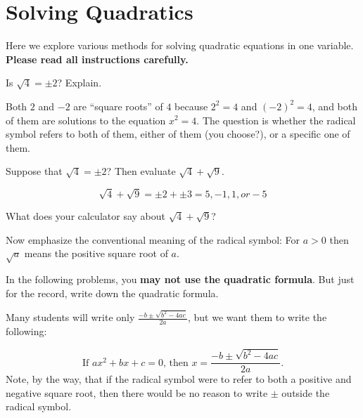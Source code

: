 \newpage
\section{Solving Quadratics}\label{A:solvingQuadratics}
Here we explore various methods for solving quadratic equations in one variable.  \textbf{Please read all instructions carefully.}

\begin{prob}
Is $\sqrt{4}=\pm 2$?  Explain. 
\end{prob}

\vfill

\begin{teachingnote}
Both $2$ and $-2$ are ``square roots'' of $4$ because $2^2=4$ and $(-2)^2=4$, and both of them are solutions to the equation $x^2=4$.  The question is whether the radical symbol refers to both of them, either of them (you choose?), or a specific one of them.  
\end{teachingnote}

\begin{prob}
Suppose that $\sqrt{4}=\pm 2$?  Then evaluate $\sqrt{4}+\sqrt{9}$.  
\end{prob}

\begin{teachingnote}
$$\sqrt{4}+\sqrt{9}=\pm2+\pm3=5, -1, 1, or -5$$
\end{teachingnote}

\vfill

\begin{prob}
What does your calculator say about $\sqrt{4}+\sqrt{9}$?  
\end{prob}

\vfill 

\begin{teachingnote}
Now emphasize the conventional meaning of the radical symbol:  For $a>0$ then $\sqrt{a}$ means the positive square root of $a$.  
\end{teachingnote}



\begin{prob}
In the following problems, you \textbf{may not use the quadratic formula}.  But just for the record, write down the quadratic formula.  
\end{prob}
\begin{teachingnote}
Many students will write only $\frac{-b\pm\sqrt{b^2-4ac}}{2a}$, but we want them to write the following:  

$$\text{If }ax^2+bx+c=0\text{, then }x=\frac{-b\pm\sqrt{b^2-4ac}}{2a}\text{.}$$
Note, by the way, that if the radical symbol were to refer to both a positive and negative square root, then there would be no reason to write $\pm$ outside the radical symbol.  
\end{teachingnote}

